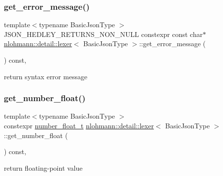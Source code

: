\subsubsection{\texorpdfstring{get\+\_\+error\+\_\+message()}{get\_error\_message()}}
{\footnotesize\ttfamily template$<$typename Basic\+Json\+Type $>$ \\
J\+S\+O\+N\+\_\+\+H\+E\+D\+L\+E\+Y\+\_\+\+R\+E\+T\+U\+R\+N\+S\+\_\+\+N\+O\+N\+\_\+\+N\+U\+LL constexpr const char$\ast$ \hyperlink{classnlohmann_1_1detail_1_1lexer}{nlohmann\+::detail\+::lexer}$<$ Basic\+Json\+Type $>$\+::get\+\_\+error\+\_\+message (\begin{DoxyParamCaption}{ }\end{DoxyParamCaption}) const\hspace{0.3cm}{\ttfamily [inline]}, {\ttfamily [noexcept]}}



return syntax error message 

\mbox{\label{classnlohmann_1_1detail_1_1lexer_ac013af35a21e9387993b19da5b3e0ae2}} 
\subsubsection{\texorpdfstring{get\+\_\+number\+\_\+float()}{get\_number\_float()}}
{\footnotesize\ttfamily template$<$typename Basic\+Json\+Type $>$ \\
constexpr \hyperlink{classnlohmann_1_1detail_1_1lexer_aa7f9e7b2bcd311fb86e2da43761a6619}{number\+\_\+float\+\_\+t} \hyperlink{classnlohmann_1_1detail_1_1lexer}{nlohmann\+::detail\+::lexer}$<$ Basic\+Json\+Type $>$\+::get\+\_\+number\+\_\+float (\begin{DoxyParamCaption}{ }\end{DoxyParamCaption}) const\hspace{0.3cm}{\ttfamily [inline]}, {\ttfamily [noexcept]}}



return floating-\/point value 

\mbox{\label{classnlohmann_1_1detail_1_1lexer_afa338d17c0a7e834c73104258a2c8ced}} 
